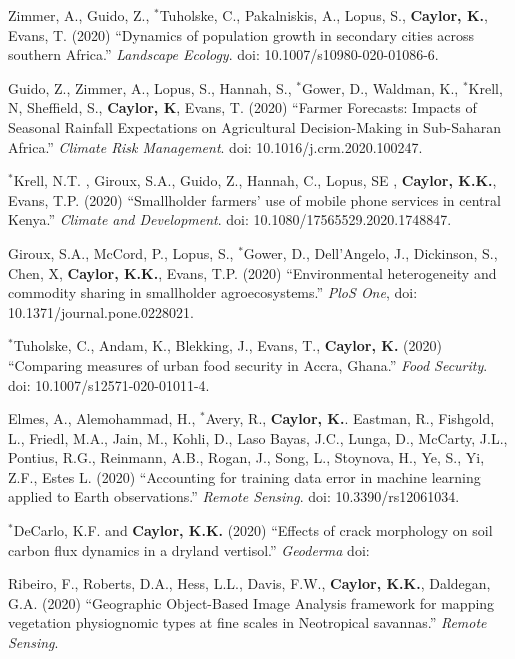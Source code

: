 \documentclass[10pt]{report}
\begin{document}
\begin{etaremune}
\item Zimmer, A., Guido, Z., $^{*}$Tuholske, C., Pakalniskis, A., Lopus, S., \textbf{Caylor, K.}, Evans, T. (2020) ``Dynamics of population growth in secondary cities across southern Africa.'' {\em Landscape Ecology}. doi: 10.1007/s10980-020-01086-6.

\item Guido, Z., Zimmer, A., Lopus, S., Hannah, S., $^{*}$Gower, D.,  Waldman, K., $^{*}$Krell, N, Sheffield, S., \textbf{Caylor, K},  Evans, T. (2020) ``Farmer Forecasts: Impacts of Seasonal Rainfall Expectations on Agricultural Decision-Making in Sub-Saharan Africa.'' {\em Climate Risk Management}. doi: 10.1016/j.crm.2020.100247.

\item  $^{*}$Krell, N.T. , Giroux, S.A., Guido, Z., Hannah, C., Lopus, SE , \textbf{Caylor, K.K.}, Evans, T.P. (2020) ``Smallholder farmers' use of mobile phone services in central Kenya.'' {\em Climate and Development}. doi: 10.1080/17565529.2020.1748847.

\item Giroux, S.A., McCord, P., Lopus, S., $^{*}$Gower, D., Dell’Angelo, J., Dickinson, S., Chen, X, \textbf{Caylor, K.K.}, Evans, T.P. (2020) ``Environmental heterogeneity and commodity sharing in smallholder agroecosystems.'' {\em PloS One}, doi: 10.1371/journal.pone.0228021.

\item  $^{*}$Tuholske, C., Andam, K., Blekking, J., Evans, T., \textbf{Caylor, K.} (2020) ``Comparing measures of urban food security in Accra, Ghana.'' {\em Food Security}. doi: 10.1007/s12571-020-01011-4.

\item Elmes, A., Alemohammad, H.,  $^{*}$Avery, R., \textbf{Caylor, K.}. Eastman, R., Fishgold, L., Friedl, M.A., Jain, M., Kohli, D., Laso Bayas, J.C., Lunga, D., McCarty, J.L., Pontius, R.G., Reinmann, A.B., Rogan, J., Song, L., Stoynova, H., Ye, S., Yi, Z.F., Estes L. (2020) ``Accounting for training data error in machine learning applied to Earth observations.'' {\em Remote Sensing}. doi: 10.3390/rs12061034.

\item  $^{*}$DeCarlo, K.F. and \textbf{Caylor, K.K.} (2020) ``Effects of crack morphology on soil carbon flux dynamics in a dryland vertisol.'' {\em Geoderma} doi: 

\item Ribeiro, F., Roberts, D.A., Hess, L.L., Davis, F.W., \textbf{Caylor, K.K.}, Daldegan, G.A. (2020) ``Geographic Object-Based Image Analysis framework for mapping vegetation physiognomic types at fine scales in Neotropical savannas.'' {\em Remote Sensing}. 


\end{etaremune}
\end{document}
